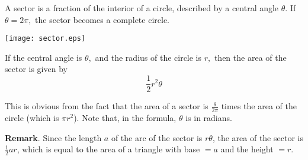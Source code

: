\documentclass[12pt]{article}
\begin{document}

A sector is a fraction of the interior of a circle, described by a central angle $\theta$.
If $\theta = 2 \pi,$ the sector becomes a complete circle. 

\begin{center}
\texttt{[image: sector.eps]}
\end{center}

If the central angle is $\theta,$ and the radius of the circle is $r,$  then the area of the sector is given by
$$\frac{1}{2}r^2\theta$$

This is obvious from the fact that the area of a sector is $\frac{\theta}{2 \pi}$ times the area of the circle (which is $\pi r^2$).
Note that, in the formula,  $\theta$ is in radians.

\textbf{Remark}.  Since the length $a$ of the arc of the sector is $r\theta$, the area of the sector is $\frac{1}{2}ar$, which is equal to the area of a triangle with base $=a$ and the height $=r$.
\end{document}
